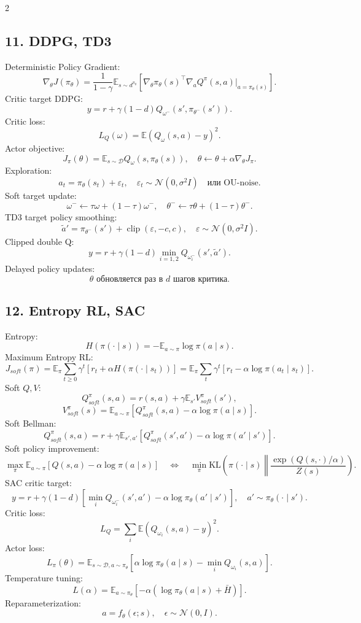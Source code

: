 \documentclass[8pt,a4paper]{extarticle}
\newcommand{\E}{\mathbb E}
\newcommand{\KL}{\mathrm{KL}}
\newcommand{\clip}{\operatorname{clip}}
\newcommand{\cD}{\mathcal D}
\newcommand{\1}{\mathbf 1}
\begin{document}
\begin{multicols*}{2}
\subsection*{11. DDPG, TD3}
Deterministic Policy Gradient:
\[
\nabla_\theta J(\pi_\theta)=\frac1{1-\gamma}\E_{s\sim d^{\pi_\theta}}\left[\nabla_\theta\pi_\theta(s)^\top\nabla_a Q^\pi(s,a)\vert_{a=\pi_\theta(s)}\right].
\]
Critic target DDPG:
\[
y=r+\gamma(1-d)Q_{\omega^-}(s',\pi_{\theta^-}(s')).
\]
Critic loss:
\[
L_Q(\omega)=\E(Q_\omega(s,a)-y)^2.
\]
Actor objective:
\[
J_\pi(\theta)=\E_{s\sim\cD}Q_\omega(s,\pi_\theta(s)),
\quad
\theta\leftarrow\theta+\alpha\nabla_\theta J_\pi.
\]
Exploration:
\[
a_t=\pi_\theta(s_t)+\varepsilon_t,
\quad \varepsilon_t\sim\mathcal N(0,\sigma^2I)
\quad\text{или OU-noise}.
\]
Soft target update:
\[
\omega^-\leftarrow\tau\omega+(1-\tau)\omega^-,
\quad \theta^-\leftarrow\tau\theta+(1-\tau)\theta^-.
\]
TD3 target policy smoothing:
\[
\tilde a'=\pi_{\theta^-}(s')+\clip(\varepsilon,-c,c),
\quad \varepsilon\sim\mathcal N(0,\sigma^2I).
\]
Clipped double Q:
\[
y=r+\gamma(1-d)\min_{i=1,2}Q_{\omega_i^-}(s',\tilde a').
\]
Delayed policy updates:
\[
\theta\text{ обновляется раз в }d\text{ шагов критика.}
\]

\subsection*{12. Entropy RL, SAC}
Entropy:
\[
H(\pi(\cdot\mid s))=-\E_{a\sim\pi}\log\pi(a\mid s).
\]
Maximum Entropy RL:
\[
J_{soft}(\pi)=\E_\pi\sum_{t\ge0}\gamma^t\left[r_t+\alpha H(\pi(\cdot\mid s_t))\right]
=\E_\pi\sum_t\gamma^t\left[r_t-\alpha\log\pi(a_t\mid s_t)\right].
\]
Soft $Q,V$:
\[
Q^\pi_{soft}(s,a)=r(s,a)+\gamma\E_{s'}V^\pi_{soft}(s'),
\]
\[
V^\pi_{soft}(s)=\E_{a\sim\pi}\left[Q^\pi_{soft}(s,a)-\alpha\log\pi(a\mid s)\right].
\]
Soft Bellman:
\[
Q^\pi_{soft}(s,a)=r+\gamma\E_{s',a'}\left[Q^\pi_{soft}(s',a')-\alpha\log\pi(a'\mid s')\right].
\]
Soft policy improvement:
\[
\max_\pi \E_{a\sim\pi}\left[Q(s,a)-\alpha\log\pi(a\mid s)\right]
\quad\Leftrightarrow\quad
\min_\pi \KL\left(\pi(\cdot\mid s)\middle\Vert \frac{\exp(Q(s,\cdot)/\alpha)}{Z(s)}\right).
\]
SAC critic target:
\[
y=r+\gamma(1-d)\left[\min_iQ_{\omega_i^-}(s',a')-\alpha\log\pi_\theta(a'\mid s')\right],
\quad a'\sim\pi_\theta(\cdot\mid s').
\]
Critic loss:
\[
L_Q=\sum_i\E(Q_{\omega_i}(s,a)-y)^2.
\]
Actor loss:
\[
L_\pi(\theta)=\E_{s\sim\cD,a\sim\pi_\theta}\left[\alpha\log\pi_\theta(a\mid s)-\min_iQ_{\omega_i}(s,a)\right].
\]
Temperature tuning:
\[
L(\alpha)=\E_{a\sim\pi_\theta}\left[-\alpha(\log\pi_\theta(a\mid s)+\bar H)\right].
\]
Reparameterization:
\[
a=f_\theta(\epsilon;s),\quad \epsilon\sim\mathcal N(0,I).
\]


\end{multicols*}
\end{document}
